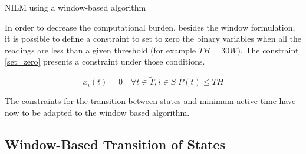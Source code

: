 \begin{algorithm}\label{algorithm1}
\SetAlgoLined
 \caption{NILM using a window-based algorithm}
\end{algorithm}


In order to decrease the computational burden, besides the window formulation, it is possible to define a constraint to set to zero the binary variables when all the readings are less than a given threshold (for example $TH = 30W$). The constraint \eqref{set_zero} presents a constraint under those conditions. 

\begin{equation} \label{set_zero}
   x_i(t) = 0 \quad \forall t \in \tilde{T}, i \in S | P(t) \leq TH
\end{equation}

The constraints for the transition between states and minimum active time have now to be adapted to the window based algorithm.

\subsection{Window-Based Transition of States}

